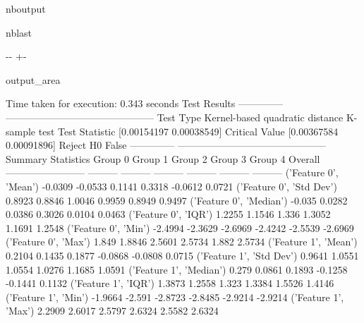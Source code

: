 \documentclass[letterpaper,10pt,english,openany,oneside]{sphinxmanual}
\begin{document}
\begin{sphinxuseclass}{nboutput}
\begin{sphinxuseclass}{nblast}
{

\kern-\sphinxverbatimsmallskipamount\kern-\baselineskip
\kern+\FrameHeightAdjust\kern-\fboxrule
\vspace{\nbsphinxcodecellspacing}

\begin{sphinxuseclass}{output_area}
\begin{sphinxuseclass}{}


\begin{sphinxVerbatim}[commandchars=\\\{\}]
Time taken for execution: 0.343 seconds
Test Results
--------------  ---------------------------------------------
Test Type       Kernel-based quadratic distance K-sample test
Test Statistic  [0.00154197 0.00038549]
Critical Value  [0.00367584 0.00091896]
Reject H0       False
--------------  ---------------------------------------------
Summary Statistics
                            Group 0    Group 1    Group 2    Group 3    Group 4    Overall
------------------------  ---------  ---------  ---------  ---------  ---------  ---------
('Feature 0', 'Mean')       -0.0309    -0.0533     0.1141     0.3318    -0.0612     0.0721
('Feature 0', 'Std Dev')     0.8923     0.8846     1.0046     0.9959     0.8949     0.9497
('Feature 0', 'Median')     -0.035      0.0282     0.0386     0.3026     0.0104     0.0463
('Feature 0', 'IQR')         1.2255     1.1546     1.336      1.3052     1.1691     1.2548
('Feature 0', 'Min')        -2.4994    -2.3629    -2.6969    -2.4242    -2.5539    -2.6969
('Feature 0', 'Max')         1.849      1.8846     2.5601     2.5734     1.882      2.5734
('Feature 1', 'Mean')        0.2104     0.1435     0.1877    -0.0868    -0.0808     0.0715
('Feature 1', 'Std Dev')     0.9641     1.0551     1.0554     1.0276     1.1685     1.0591
('Feature 1', 'Median')      0.279      0.0861     0.1893    -0.1258    -0.1441     0.1132
('Feature 1', 'IQR')         1.3873     1.2558     1.323      1.3384     1.5526     1.4146
('Feature 1', 'Min')        -1.9664    -2.591     -2.8723    -2.8485    -2.9214    -2.9214
('Feature 1', 'Max')         2.2909     2.6017     2.5797     2.6324     2.5582     2.6324
\end{sphinxVerbatim}



\end{sphinxuseclass}
\end{sphinxuseclass}
}

\end{sphinxuseclass}
\end{sphinxuseclass}
\end{document}
